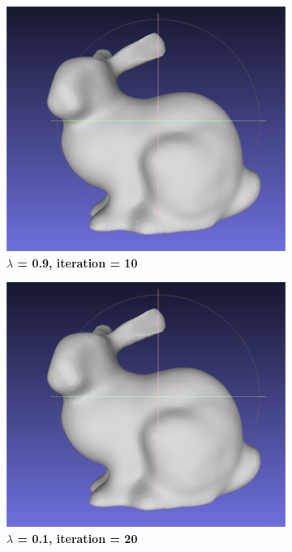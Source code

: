 \documentclass{ctexart}
\begin{document}
\begin{figure}[htbp]
\begin{subfigure}[htbp]{0.24\linewidth}
        \centering
        \includegraphics[width=0.9\linewidth]{figures/9.png}
        \caption{\textbf{$\lambda$ = 0.9, iteration = 10}}
    \end{subfigure}
    \begin{subfigure}[htbp]{0.24\linewidth}
        \centering
        \includegraphics[width=0.9\linewidth]{figures/9.png}
        \caption{\textbf{$\lambda$ = 0.1, iteration = 20}}
    \end{subfigure}
    \begin{subfigure}[htbp]{0.24\linewidth}
        \centering

\end{subfigure}
\end{figure}
\end{document}
